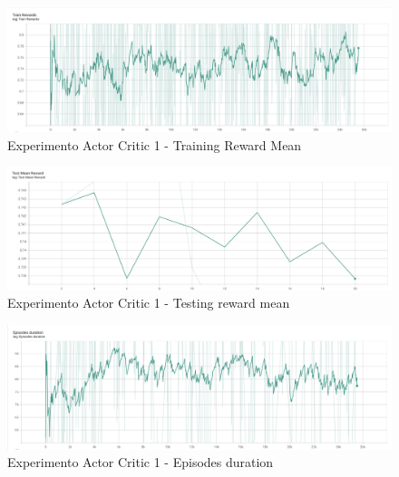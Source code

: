 \begin{figure}[H]
	\centering
	\includegraphics[width=1\textwidth]{figuras/experiments/actor_critic/actor_critic_20_epochs/train_rewards.png}
	\caption[Experimento Actor Critic 1 - Training Reward Mean]{Experimento Actor Critic 1 - Training Reward Mean}
	\label{fig-experimento-actor-critic-1-training-reward-mean}
\end{figure}
\begin{figure}[H]
	\centering
	\includegraphics[width=1\textwidth]{figuras/experiments/actor_critic/actor_critic_20_epochs/test_mean_reward.png}
	\caption[Experimento Actor Critic 1 - Testing reward mean]{Experimento Actor Critic 1 - Testing reward mean}
	\label{fig-experimento-actor-critic-1-testing-reward-mean}
\end{figure}
\begin{figure}[H]
	\centering
	\includegraphics[width=1\textwidth]{figuras/experiments/actor_critic/actor_critic_20_epochs/episodes_duration.png}
	\caption[Experimento Actor Critic 1 - Episodes duration]{Experimento Actor Critic 1 - Episodes duration}
	\label{fig-experimento-actor-critic-1-episodes-duration}
\end{figure}


